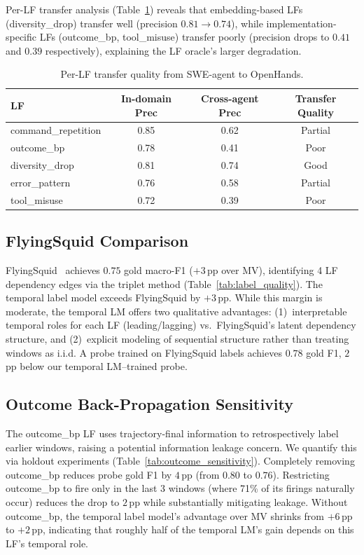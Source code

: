 \documentclass[11pt]{article}
\begin{document}
Per-LF transfer analysis (Table~\ref{tab:lf_transfer}) reveals that embedding-based LFs (diversity\_drop) transfer well (precision $0.81 \rightarrow 0.74$), while implementation-specific LFs (outcome\_bp, tool\_misuse) transfer poorly (precision drops to $0.41$ and $0.39$ respectively), explaining the LF oracle's larger degradation.

\begin{table}[t]
\centering
\caption{Per-LF transfer quality from SWE-agent to OpenHands.}
\label{tab:lf_transfer}
\small
\begin{tabular}{lccc}
\toprule
LF & In-domain Prec & Cross-agent Prec & Transfer Quality \\
\midrule
command\_repetition & 0.85 & 0.62 & Partial \\
outcome\_bp & 0.78 & 0.41 & Poor \\
diversity\_drop & 0.81 & 0.74 & Good \\
error\_pattern & 0.76 & 0.58 & Partial \\
tool\_misuse & 0.72 & 0.39 & Poor \\
\bottomrule
\end{tabular}
\end{table}

\subsection{FlyingSquid Comparison}
\label{sec:flyingsquid}

FlyingSquid~\citep{fu2020fast} achieves $0.75$ gold macro-F1 ($+3$\,pp over MV), identifying 4 LF dependency edges via the triplet method (Table~\ref{tab:label_quality}).
The temporal label model exceeds FlyingSquid by $+3$\,pp.
While this margin is moderate, the temporal LM offers two qualitative advantages: (1)~interpretable temporal roles for each LF (leading/lagging) vs.\ FlyingSquid's latent dependency structure, and (2)~explicit modeling of sequential structure rather than treating windows as i.i.d.
A probe trained on FlyingSquid labels achieves $0.78$ gold F1, $2$\,pp below our temporal LM--trained probe.

\subsection{Outcome Back-Propagation Sensitivity}
\label{sec:outcome_bp}

The outcome\_bp LF uses trajectory-final information to retrospectively label earlier windows, raising a potential information leakage concern.
We quantify this via holdout experiments (Table~\ref{tab:outcome_sensitivity}).
Completely removing outcome\_bp reduces probe gold F1 by $4$\,pp (from $0.80$ to $0.76$).
Restricting outcome\_bp to fire only in the last 3 windows (where 71\% of its firings naturally occur) reduces the drop to $2$\,pp while substantially mitigating leakage.
Without outcome\_bp, the temporal label model's advantage over MV shrinks from $+6$\,pp to $+2$\,pp, indicating that roughly half of the temporal LM's gain depends on this LF's temporal role.
\end{document}
